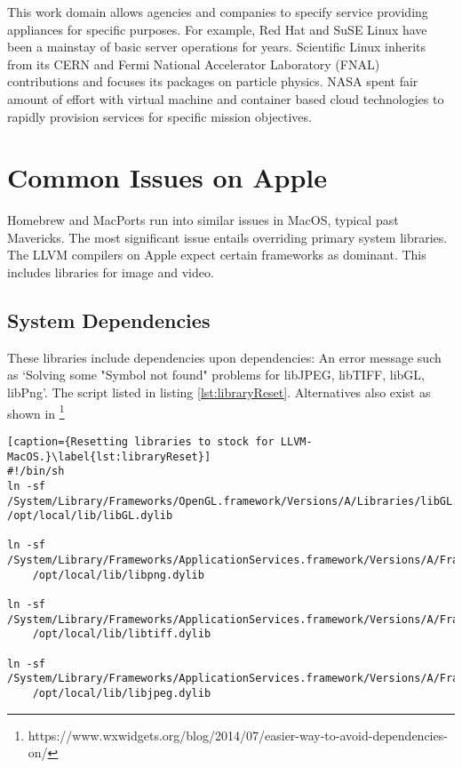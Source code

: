 \documentclass[
  a4paper, %
  11pt, %
  twoside,    %
  onecolumn,  %
  openright,  %
]{memoir}
\begin{document}
This work domain allows agencies and companies to specify service providing appliances for specific purposes.  For example, Red Hat and SuSE Linux have been a mainstay of basic server operations for years.  Scientific Linux inherits from its CERN and Fermi National Accelerator Laboratory (FNAL) contributions and focuses its packages on particle physics.  NASA spent fair amount of effort with virtual machine and container based cloud technologies to rapidly provision services for specific mission objectives.  %

\chapter{Common Issues on Apple}

Homebrew and MacPorts run into similar issues in MacOS, typical past Mavericks.  The most significant issue entails overriding primary system libraries.  The LLVM compilers on Apple expect certain frameworks as dominant.  This includes libraries for image and video.  

\section{System Dependencies} %
\label{sec:system_dependencies}
These libraries include dependencies upon dependencies:
An error message such as `Solving some "Symbol not found" problems for libJPEG, libTIFF, libGL, libPng'. The script listed in listing \ref{lst:libraryReset}.  Alternatives also exist as shown 
in \footnote{
	https://www.wxwidgets.org/blog/2014/07/easier-way-to-avoid-dependencies-on/}

\begin{tiny}

	\begin{lstlisting}[caption={Resetting libraries to stock for LLVM-MacOS.}\label{lst:libraryReset}]
#!/bin/sh
ln -sf /System/Library/Frameworks/OpenGL.framework/Versions/A/Libraries/libGL.dylib /opt/local/lib/libGL.dylib

ln -sf 
/System/Library/Frameworks/ApplicationServices.framework/Versions/A/Frameworks/ImageIO.framework/Versions/A/Resources/libPng.dylib 
	/opt/local/lib/libpng.dylib

ln -sf
/System/Library/Frameworks/ApplicationServices.framework/Versions/A/Frameworks/ImageIO.framework/Versions/A/Resources/libTIFF.dylib
	/opt/local/lib/libtiff.dylib

ln -sf /System/Library/Frameworks/ApplicationServices.framework/Versions/A/Frameworks/ImageIO.framework/Versions/A/Resources/libJPEG.dylib 
	/opt/local/lib/libjpeg.dylib
	\end{lstlisting}
\end{tiny}
\end{document}
